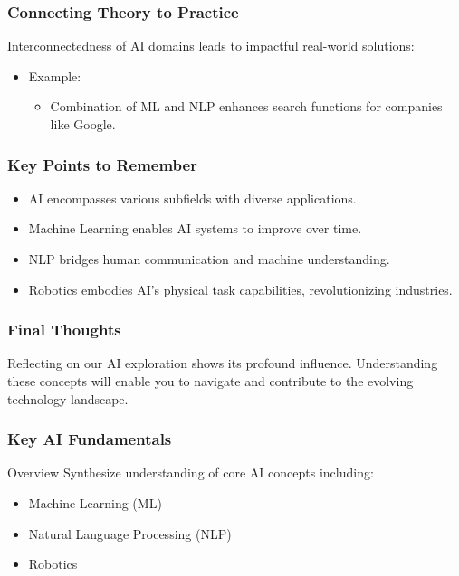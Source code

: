 \documentclass[aspectratio=169]{beamer}
\begin{document}
\begin{frame}[fragile]
    \frametitle{Connecting Theory to Practice}
    Interconnectedness of AI domains leads to impactful real-world solutions:
    \begin{itemize}
        \item Example: 
        \begin{itemize}
            \item Combination of ML and NLP enhances search functions for companies like Google.
        \end{itemize}
    \end{itemize}
\end{frame}

\begin{frame}[fragile]
    \frametitle{Key Points to Remember}
    \begin{itemize}
        \item AI encompasses various subfields with diverse applications.
        \item Machine Learning enables AI systems to improve over time.
        \item NLP bridges human communication and machine understanding.
        \item Robotics embodies AI's physical task capabilities, revolutionizing industries.
    \end{itemize}
\end{frame}

\begin{frame}[fragile]
    \frametitle{Final Thoughts}
    Reflecting on our AI exploration shows its profound influence. 
    Understanding these concepts will enable you to navigate and contribute to the evolving technology landscape.
\end{frame}

\begin{frame}[fragile]
    \frametitle{Key AI Fundamentals}
    \begin{block}{Overview}
        Synthesize understanding of core AI concepts including:
        \begin{itemize}
            \item Machine Learning (ML)
            \item Natural Language Processing (NLP)
            \item Robotics
        \end{itemize}
    \end{block}
\end{frame}
\end{document}
